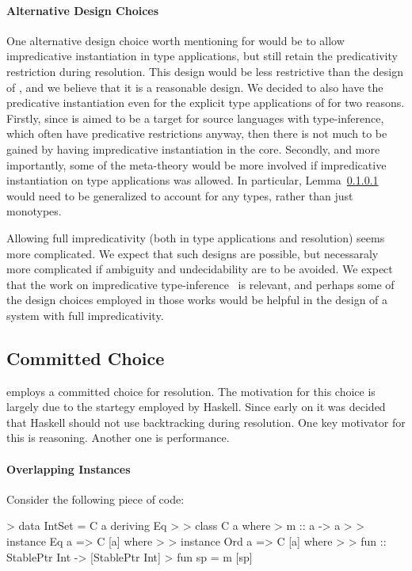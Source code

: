 \paragraph{Alternative Design Choices} One alternative design choice
worth mentioning for \name would be to allow impredicative
instantiation in type applications, but still retain the predicativity
restriction during resolution. This design would be less restrictive
than the design of \name, and we believe that it is a reasonable
design. We decided to also have the predicative instantiation even 
for the explicit type applications of \name for two reasons. Firstly, 
since \name is aimed to be a target for source languages with
type-inference, which often have predicative restrictions anyway, then 
there is not much to be gained by having impredicative instantiation
in the core. Secondly, and more importantly, some of the meta-theory
would be more involved if impredicative instantiation on type
applications was allowed. In particular, Lemma~\ref{} would need 
to be generalized to account for any types, rather than just
monotypes.

Allowing full impredicativity (both in type applications and
resolution) seems more complicated. We expect that such designs 
are possible, but necessaraly more complicated if ambiguity and
undecidability are to be avoided. We expect that the work on
impredicative type-inference~\cite{} is relevant, and perhaps some 
of the design choices employed in those works would be helpful 
in the design of a system with full impredicativity.  


\subsection{Committed Choice}

\name employs a committed choice for resolution. The motivation for this choice is 
largely due to the startegy employed by Haskell. Since early on it was decided that Haskell 
should not use backtracking during resolution. One key motivator for this is reasoning. Another 
one is performance.

\paragraph{Overlapping Instances}

Consider the following piece of code:


> data IntSet = C a deriving Eq
> 
> class C a where
>   m :: a -> a
>
> instance Eq a => C [a] where
> 
> instance Ord a => C [a] where
> 
> fun :: StablePtr Int -> [StablePtr Int]
> fun sp = m [sp]

